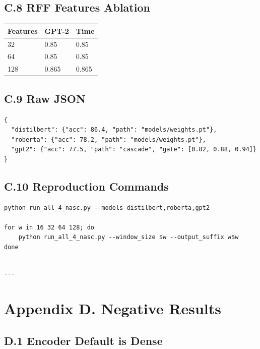 \subsection{C.8 RFF Features Ablation}

\begin{table}[H]
\centering
\small
\begin{tabular}{lll}
\toprule
\textbf{Features} & \textbf{GPT-2} & \textbf{Time} \\
\midrule
32 & 0.85 & 0.85 \\
64 & 0.85 & 0.85 \\
128 & 0.865 & 0.865 \\
\bottomrule
\end{tabular}
\end{table}

\subsection{C.9 Raw JSON}

\begin{lstlisting}
{
  "distilbert": {"acc": 86.4, "path": "models/weights.pt"},
  "roberta": {"acc": 78.2, "path": "models/weights.pt"},
  "gpt2": {"acc": 77.5, "path": "cascade", "gate": [0.82, 0.88, 0.94]}
}
\end{lstlisting}

\subsection{C.10 Reproduction Commands}

\begin{lstlisting}
python run_all_4_nasc.py --models distilbert,roberta,gpt2

for w in 16 32 64 128; do
    python run_all_4_nasc.py --window_size $w --output_suffix w$w
done
\end{lstlisting}
\begin{lstlisting}

---
\end{lstlisting}


\section{Appendix D. Negative Results}

\subsection{D.1 Encoder Default is Dense}

